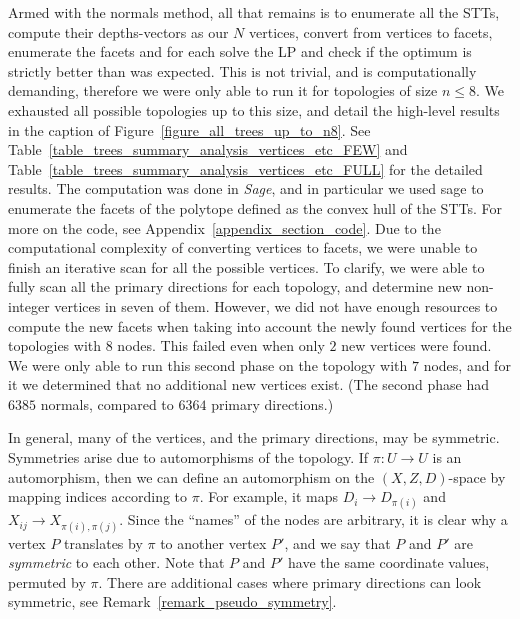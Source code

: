 Armed with the normals method, all that remains is to enumerate all the STTs, compute their depths-vectors as our $N$ vertices, convert from vertices to facets, enumerate the facets and for each solve the LP and check if the optimum is strictly better than was expected. This is not trivial, and is computationally demanding, therefore we were only able to run it for topologies of size $n \le 8$. We exhausted all possible topologies up to this size, and detail the high-level results in the caption of Figure~\ref{figure_all_trees_up_to_n8}. See Table~\ref{table_trees_summary_analysis_vertices_etc_FEW} and Table~\ref{table_trees_summary_analysis_vertices_etc_FULL} for the detailed results. The computation was done in \emph{Sage}, and in particular
we used sage to enumerate the facets of the polytope defined as the convex hull of the STTs.
For more on the code, see Appendix~\ref{appendix_section_code}. Due to the computational complexity of converting vertices to facets, we were unable to finish an iterative scan for all the possible vertices. To clarify, we were able to fully scan all the primary directions for each topology, and determine new non-integer vertices in seven of them. However, we did not have enough resources to compute the new facets when taking into account the newly found vertices for the topologies with $8$ nodes.
This failed even when only $2$ new vertices were found. We were only able to run this second phase on the topology with $7$ nodes, and for it we determined that no additional new vertices exist. (The second phase had $6385$ normals, compared to $6364$ primary directions.)

In general, many of the vertices, and the primary directions, may be symmetric. Symmetries arise due to automorphisms of the topology. If $\pi: U \to U$ is an automorphism, then we can define an automorphism on the $(X,Z,D)$-space by mapping indices according to $\pi$. For example, it maps $D_i \to D_{\pi(i)}$ and $X_{ij} \to X_{\pi(i),\pi(j)}$. Since the ``names'' of the nodes are arbitrary, it is clear why a vertex $P$ translates by $\pi$ to another vertex $P'$, and we say that $P$ and $P'$ are \emph{symmetric} to each other. Note that $P$ and $P'$ have the same coordinate values, permuted by $\pi$. There are additional cases where primary directions can look symmetric, see Remark~\ref{remark_pseudo_symmetry}.


